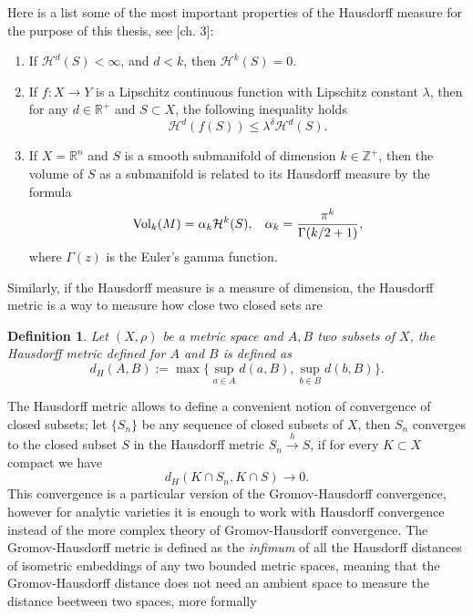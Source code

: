 \documentclass[12pt,twoside,a4paper]{report}
\newtheorem{definition}{Definition}[section]
\newcommand{\zah}{\ensuremath{ \mathbb Z }}
\newcommand{\re}{\ensuremath{\mathbb R }}
\begin{document}
\noindent Here is a list some of the most important properties of the Hausdorff measure for the purpose of this thesis, see \cite{Stolzenberg}[ch. 3]:

\begin{enumerate}
        \item[1.] If $\mathcal{H}^d(S)<\infty$, and $d<k$, then $\mathcal{H}^k(S)=0$.\\

        \item[2.] If $f:X\rightarrow Y$ is a Lipschitz continuous function with
        Lipschitz constant $\lambda$, then for any $d\in\re^{+}$ and
        $S\subset X$, the following inequality holds
        \[
        \mathcal{H}^d(f(S))\leq\lambda^{\delta}\mathcal{H}^d(S).
        \]
        \item[3.]If $X=\re^{n}$ and $S$ is a smooth submanifold of dimension
        $k\in\zah^{+}$, then the volume of $S$ as a submanifold is related to
        its Hausdorff measure by the formula
        \[
        \textrm{Vol}_{k}(M)=\alpha_{k}\mathcal{H}^k(S),\hspace*{0.3cm}\alpha_k= \frac{\pi^k}{\Gamma(k/2+1)},
        \]
\noindent where $\Gamma(z)$ is the Euler's gamma function.
\end{enumerate}
Similarly, if the Hausdorff measure is a measure of dimension, the Hausdorff metric is a way to measure how close two closed sets are
\begin{definition}
Let $(X,\rho)$ be a metric space and $A,B$ two subsets of $X$, the Hausdorff metric defined for $A$
and $B$ is defined as
\[
d_H(A,B):= \max\Big\{\sup_{a\in A}d(a,B),\sup_{b\in B}d(b,B)\Big\}.
\]
\end{definition}
The Hausdorff metric allows to define a convenient notion of convergence of closed subsets; let $\{S_n \}$ be any sequence of closed subsets of $X$, then $S_n$ converges to the closed subset $S$ in the Hausdorff metric $S_n\overset{h}\rightarrow S$, if for every $K\subset X$ compact we have
\[
  d_H(K\cap S_n,K\cap S)\rightarrow 0.
\]
\noindent This convergence is a particular version of the Gromov-Hausdorff convergence, however for analytic varieties it is enough to work with Hausdorff convergence instead of the more complex theory of Gromov-Hausdorff convergence.
The Gromov-Hausdorff metric is defined as the \emph{infimum} of all the Hausdorff distances of isometric embeddings of any two bounded metric spaces, meaning that the Gromov-Hausdorff distance does not need an ambient space to measure the distance beetween two spaces, more formally
\end{document}
